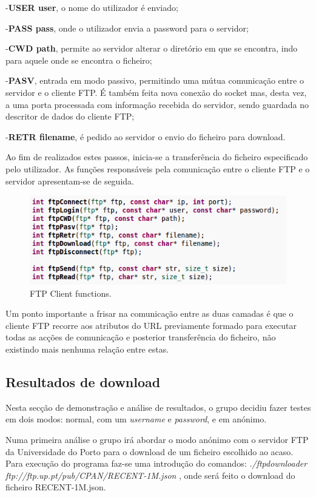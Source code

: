 \documentclass[a4paper]{article}
\begin{document}
 -\textbf{USER user}, o nome do utilizador é enviado;
 
 -\textbf{PASS pass}, onde o utilizador envia a password para o servidor;
 
 -\textbf{CWD path}, permite ao servidor alterar o diretório em que se encontra, indo para aquele onde se encontra o ficheiro;
 
 -\textbf{PASV}, entrada em modo passivo, permitindo uma mútua comunicação entre o servidor e o cliente FTP. É também feita nova conexão do socket mas, desta vez, a uma porta processada com informação recebida do servidor, sendo guardada no descritor de dados do cliente FTP;
 
 -\textbf{RETR filename}, é pedido ao servidor o envio do ficheiro para download.
 
Ao fim de realizados estes passos, inicia-se a transferência do ficheiro especificado pelo utilizador. As funções responsáveis pela comunicação entre o cliente FTP e o servidor apresentam-se de seguida.

\begin{figure}[h!]
\centering
\includegraphics[scale=0.5]{res/ftp-functions.png}
\caption{FTP Client functions.}
\end{figure}

Um ponto importante a frisar na comunicação entre as duas camadas é que o cliente FTP recorre aos atributos do URL previamente formado para executar todas as acções de comunicação e posterior transferência do ficheiro, não existindo mais nenhuma relação entre estas.

\subsection{Resultados de download}
Nesta secção de demonstração e análise de resultados, o grupo decidiu fazer testes em dois modos: normal, com um \textit{username} e \textit{password}, e em anónimo.

Numa primeira análise o grupo irá abordar o modo anónimo com o servidor FTP da Universidade do Porto para o download de um ficheiro escolhido ao acaso.
Para execução do programa faz-se uma introdução do comandos:
\textit{./ftpdownloader ftp://ftp.up.pt/pub/CPAN/RECENT-1M.json} , onde será feito o download do ficheiro RECENT-1M.json.
\end{document}
